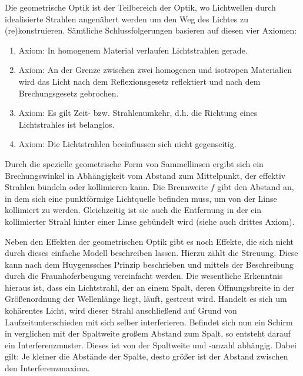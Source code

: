 
Die geometrische Optik ist der Teilbereich der Optik, wo Lichtwellen durch idealisierte Strahlen angenähert werden um den Weg des Lichtes zu (re)konstruieren. Sämtliche Schlussfolgerungen basieren auf diesen vier Axiomen:

\begin{enumerate}
	\item{Axiom:} In homogenem Material verlaufen Lichtstrahlen gerade.
	\item{Axiom:} An der Grenze zwischen zwei homogenen und isotropen Materialien wird das Licht nach dem Reflexionsgesetz reflektiert und nach dem Brechungsgesetz gebrochen.
	\item{Axiom:} Es gilt Zeit- bzw. Strahlenumkehr, d.h. die Richtung eines Lichtstrahles ist belanglos.
	\item{Axiom:} Die Lichtstrahlen beeinflussen sich nicht gegenseitig.
\end{enumerate}

Durch die spezielle geometrische Form von Sammellinsen ergibt sich ein Brechungswinkel in Abhängigkeit vom Abstand zum Mittelpunkt, der effektiv Strahlen bündeln oder kollimieren kann. Die Brennweite $f$ gibt den Abstand an, in dem sich eine punktförmige Lichtquelle befinden muss, um von der Linse kollimiert zu werden. Gleichzeitig ist sie auch die Entfernung in der ein kollimierter Strahl hinter einer Linse gebündelt wird (siehe auch drittes Axiom).

Neben den Effekten der geometrischen Optik gibt es noch Effekte, die sich nicht durch dieses einfache Modell beschreiben lassen. Hierzu zählt die Streuung. Diese kann nach dem Huygenssches Prinzip  \cite{_huygenssches_????} beschrieben und mittels der Beschreibung durch die Fraunhoferbeugung \cite{_beugungsintegral_2015} \cite[Kap. 2]{stossel_fourieroptik:_1993} vereinfacht werden. Die wesentliche Erkenntnis hieraus ist, dass ein Lichtstrahl, der an einem Spalt, deren Öffnungsbreite in der Größenordnung der Wellenlänge liegt, läuft, gestreut wird. Handelt es sich um kohärentes Licht, wird dieser Strahl anschließend auf Grund von Laufzeitunterschieden mit sich selber interferieren.
Befindet sich nun ein Schirm in verglichen mit der Spaltweite großem Abstand zum Spalt, so entsteht darauf ein Interferenzmuster. Dieses ist von der Spaltweite und -anzahl abhängig. Dabei gilt: Je kleiner die Abstände der Spalte, desto größer ist der Abstand zwischen den Interferenzmaxima.

